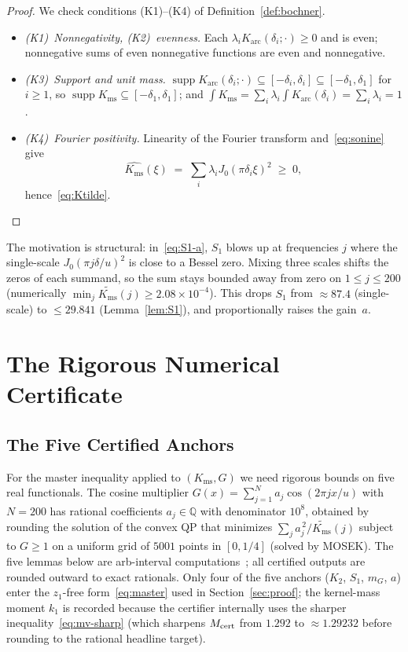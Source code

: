 \documentclass[11pt, letterpaper]{article}
\theoremstyle{plain}
\theoremstyle{definition}
\newcommand{\Q}{\mathbb{Q}}
\newcommand{\supp}{\operatorname{supp}}
\newcommand{\Karc}{K_{\mathrm{arc}}}
\newcommand{\Kms}{K_{\mathrm{ms}}}
\begin{document}
\begin{proof}
We check conditions (K1)--(K4) of Definition~\ref{def:bochner}.
\begin{itemize}[leftmargin=2em]
\item \emph{(K1)~Nonnegativity, (K2)~evenness.}  Each
  $\lambda_i\Karc(\delta_i;\cdot)\ge 0$ and is even; nonnegative sums
  of even nonnegative functions are even and nonnegative.
\item \emph{(K3)~Support and unit mass.}
  $\supp\Karc(\delta_i;\cdot)\subseteq
  [-\delta_i,\delta_i]\subseteq[-\delta_1,\delta_1]$ for $i\ge 1$, so
  $\supp\Kms\subseteq[-\delta_1,\delta_1]$; and
  $\int\Kms=\sum_i\lambda_i\int\Karc(\delta_i)=\sum_i\lambda_i=1$.
\item \emph{(K4)~Fourier positivity.}  Linearity of the Fourier
  transform and~\eqref{eq:sonine} give
  \[
    \widehat{\Kms}(\xi)
    \;=\;
    \sum_i\lambda_i J_0(\pi\delta_i\xi)^2 \;\ge\; 0,
  \]
  hence~\eqref{eq:Ktilde}.\qedhere
\end{itemize}
\end{proof}

The motivation is structural: in~\eqref{eq:S1-a}, $S_1$ blows up at
frequencies $j$ where the single-scale $J_0(\pi j\delta/u)^2$ is close
to a Bessel zero.  Mixing three scales shifts the zeros of each
summand, so the sum stays bounded away from zero on $1\le j\le 200$
(numerically $\min_j\widetilde{\Kms}(j)\ge 2.08\times 10^{-4}$).  This
drops $S_1$ from $\approx 87.4$ (single-scale) to $\le 29.841$
(Lemma~\ref{lem:S1}), and proportionally raises the gain~$a$.

\section{The Rigorous Numerical Certificate}\label{sec:cert}

\subsection{The Five Certified Anchors}\label{subsec:cert-anchors}

For the master inequality applied to $(\Kms,G)$ we need rigorous
bounds on five real functionals.  The cosine multiplier
$G(x)=\sum_{j=1}^{N}a_j\cos(2\pi jx/u)$ with $N=200$ has rational
coefficients $a_j\in\Q$ with denominator $10^{8}$, obtained by
rounding the solution of the convex QP that minimizes
$\sum_j a_j^{\,2}/\widetilde{\Kms}(j)$ subject to $G\ge 1$ on a
uniform grid of $5001$ points in $[0, 1/4]$ (solved by MOSEK).  The
five lemmas below are arb-interval computations~\cite{Flint}; all
certified outputs are rounded outward to exact rationals.  Only four
of the five anchors ($K_2$, $S_1$, $m_G$, $a$) enter the
$z_1$-free form~\eqref{eq:master} used in Section~\ref{sec:proof};
the kernel-mass moment $k_1$ is recorded because the certifier
internally uses the sharper inequality~\eqref{eq:mv-sharp} (which
sharpens $M_{\rm cert}$ from $1.292$ to $\approx 1.29232$ before
rounding to the rational headline target).
\end{document}
